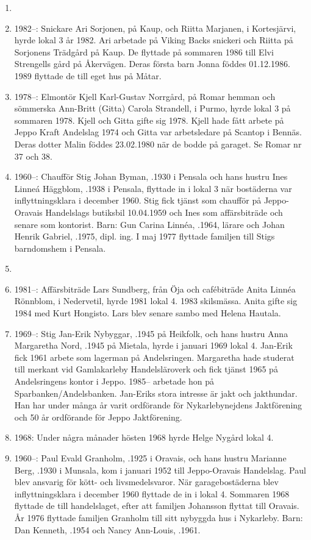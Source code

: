 \begin{enumerate}
  \item {}
  \item 1982--: Snickare Ari Sorjonen,  på Kaup, och Riitta Marjanen,  i Kortesjärvi, hyrde lokal 3 år 1982. Ari arbetade på Viking Backs snickeri och Riitta på Sorjonens Trädgård på Kaup. De flyttade på sommaren 1986 till Elvi Strengells gård på Åkervägen. Deras första barn Jonna föddes 01.12.1986. 1989 flyttade de till eget hus på Måtar.
  \item 1978--: Elmontör Kjell Karl-Gustav Norrgård,  på Romar hemman och sömmerska Ann-Britt (Gitta) Carola Strandell,  i Purmo, hyrde lokal 3 på sommaren 1978. Kjell och Gitta gifte sig 1978. Kjell hade fått arbete på Jeppo Kraft Andelslag 1974 och Gitta var arbetsledare på Scantop i Bennäs. Deras dotter Malin föddes 23.02.1980 när de bodde på garaget. Se Romar nr 37 och 38.
  \item 1960--: Chaufför Stig Johan Byman, .1930 i Pensala och hans hustru Ines Linneá Häggblom, .1938 i Pensala, flyttade in i lokal 3 när bostäderna var inflyttningsklara i december 1960. Stig fick tjänst som chaufför på Jeppo-Oravais Handelslags butiksbil 10.04.1959 och Ines som affärsbiträde och senare som kontorist. Barn: Gun Carina Linnéa, .1964, lärare och Johan Henrik Gabriel, .1975, dipl. ing. I maj 1977 flyttade familjen till Stigs barndomshem i Pensala.
  \item {}
  \item 1981--: Affärsbiträde Lars Sundberg, från Öja och cafébiträde Anita Linnéa Rönnblom,  i Nedervetil, hyrde 1981 lokal 4. 1983 skilsmässa. Anita gifte sig 1984 med Kurt Hongisto. Lars blev senare sambo med Helena Hautala.
  \item 1969--: Stig Jan-Erik Nybyggar, .1945 på Heikfolk, och hans hustru Anna Margaretha Nord, .1945 på Mietala, hyrde i januari 1969 lokal 4. Jan-Erik fick 1961 arbete som lagerman på Andelsringen. Margaretha hade studerat till merkant vid Gamlakarleby Handelsläroverk och fick tjänst 1965 på Andelsringens kontor i Jeppo.	1985-- arbetade hon på Sparbanken/Andelsbanken. Jan-Eriks stora intresse är jakt och jakthundar. Han har under många år varit ordförande för Nykarlebynejdens Jaktförening och 50 år ordförande för	Jeppo Jaktförening.
  \item 1968: Under några månader hösten 1968 hyrde Helge Nygård lokal 4.
  \item 1960--: Paul Evald Granholm, .1925 i Oravais, och hans hustru Marianne Berg, .1930 i Munsala, kom i januari 1952 till Jeppo-Oravais Handelslag. Paul blev ansvarig för kött- och livsmedelsvaror. När garagebostäderna blev inflyttningsklara i december 1960	flyttade de in i lokal 4. Sommaren 1968 flyttade de till handelslaget, efter att familjen Johansson flyttat till Oravais. År 1976 flyttade familjen Granholm till sitt nybyggda hus i Nykarleby. Barn: Dan Kenneth, .1954 och Nancy Ann-Louis, .1961.
\end{enumerate}
